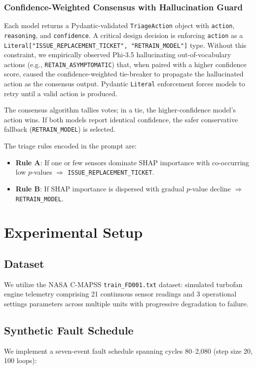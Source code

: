 \documentclass[conference, 10pt]{IEEEtran}
\begin{document}
\subsubsection{Confidence-Weighted Consensus with Hallucination Guard}
Each model returns a Pydantic-validated \texttt{TriageAction} object with \texttt{action}, \texttt{reasoning}, and \texttt{confidence}. A critical design decision is enforcing \texttt{action} as a \texttt{Literal["ISSUE\_REPLACEMENT\_TICKET", "RETRAIN\_MODEL"]} type. Without this constraint, we empirically observed Phi-3.5 hallucinating out-of-vocabulary actions (e.g., \texttt{RETAIN\_ASYMPTOMATIC}) that, when paired with a higher confidence score, caused the confidence-weighted tie-breaker to propagate the hallucinated action as the consensus output. Pydantic \texttt{Literal} enforcement forces models to retry until a valid action is produced.

The consensus algorithm tallies votes; in a tie, the higher-confidence model's action wins. If both models report identical confidence, the safer conservative fallback (\texttt{RETRAIN\_MODEL}) is selected.

The triage rules encoded in the prompt are:
\begin{itemize}
    \item \textbf{Rule A}: If one or few sensors dominate SHAP importance with co-occurring low $p$-values $\Rightarrow$ \texttt{ISSUE\_REPLACEMENT\_TICKET}.
    \item \textbf{Rule B}: If SHAP importance is dispersed with gradual $p$-value decline $\Rightarrow$ \texttt{RETRAIN\_MODEL}.
\end{itemize}

\section{Experimental Setup}

\subsection{Dataset}
We utilize the NASA C-MAPSS \texttt{train\_FD001.txt} dataset: simulated turbofan engine telemetry comprising 21 continuous sensor readings and 3 operational settings parameters across multiple units with progressive degradation to failure.

\subsection{Synthetic Fault Schedule}
We implement a seven-event fault schedule spanning cycles 80--2,080 (step size 20, 100 loops):
\end{document}
